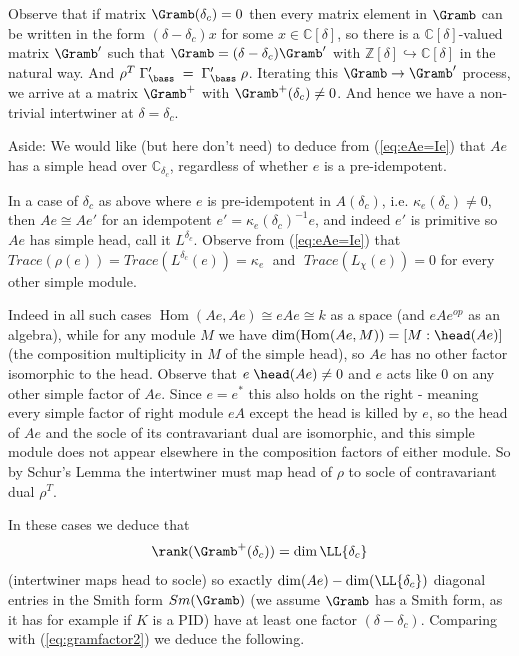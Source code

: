 \documentclass[reqno,10pt,a4paper]{amsart}
\DeclareMathOperator{\Hom}{Hom}
\newcommand{\C}{\mathbb{C}}
\newcommand{\Z}{\mathbb{Z}}
\newcommand{\red}[1]{\textcolor{red}{#1}}
\newcommand{\ppm}[1]{\red{#1}}
\newcommand{\Gram}{\Gamma}
\begin{document}
\mdef \label{pa:delta=0}
Observe that if matrix 
$\Gramb(\delta_c) = 0$    %
then every matrix element in $\Gramb$ 
can be written in the form $(\delta-\delta_c)x$ for some $x \in \C[\delta]$,
so 
there is a $\C[\delta]$-valued matrix $ \Gramb' $ such that 
$\Gramb= (\delta-\delta_c) \Gramb'$ with 
$\Z[\delta] \hookrightarrow \C[\delta]$ in the 
natural way. 
And 
$\rho^T \; \Gram_{\bass}' \; =\; \Gram_{\bass}' \; \rho$.
Iterating 
this $\Gramb\rightarrow\Gramb'$ process, 
we arrive at 
a matrix 
$\Gramb^+$ with $\Gramb^+(\delta_c  )  \neq 0 $.
{And hence we have a non-trivial intertwiner at $\delta=\delta_c$.}

Aside: 
We would like (but here don't need) to deduce from (\ref{eq:eAe=Ie}) that $Ae$ has a simple head 
over $\C_{\delta_c}$,
regardless of whether $e$ is a pre-idempotent. 

\mdef \label{pa:argument-for-4.8}
In a case of $\delta_c$ 
as above 
where $e$ is pre-idempotent in $A(\delta_c)$,
i.e. $\kappa_e(\delta_c) \neq 0$, 
then $Ae \cong Ae'$ for an idempotent 
$e' =   \kappa_e(\delta_c)^{-1}  e$, 
and indeed $e'$ is primitive so $Ae$ has simple head, call it $L^{\delta_c}$.
Observe from (\ref{eq:eAe=Ie}) that 
$Trace(\rho(e))= Trace(L^{\delta_c}(e)) = \kappa_e  \;$ 
and 
$\; Trace(L_\chi(e))=0$ for every other simple module. 

Indeed 
in all such cases
$\Hom(Ae,Ae) \cong eAe \cong k$ as a space (and $eAe^{op}$ as an algebra), 
while for any module $M$ we have 
$\dim(\Hom(Ae,M)) = [M : \head(Ae)]$ (the composition multiplicity in $M$ of the simple head),
so $Ae$ has no other factor isomorphic %
to the head.
Observe that $e\;\head(Ae)\neq 0$ and $e$ acts like 0 on any other simple factor of $Ae$.
Since $e=e^*$ this also holds on the right - meaning every simple factor 
of right module $eA$ except the head is 
killed by $e$, so the head of $Ae$ and the socle of its contravariant dual are isomorphic,
and this simple module does not appear elsewhere in the composition factors of either module.
So by Schur's Lemma the intertwiner must map head of $\rho$ to socle of contravariant dual
$\rho^T$.

In these cases we 
deduce that 
$$
\rank(\Gramb^+(\delta_c)) = \dim \LL{\delta_c} 
$$ 
(intertwiner maps head to socle)
so exactly 
$\dim(Ae) - \dim(\LL{\delta_c}) $  
diagonal entries in 
the Smith form
$Sm(\Gramb)$ 
(we assume $\Gramb$ has a Smith form, as it has for example if
$ K$ is a PID)
have at least one factor $(\delta-\delta_c)$.
%
Comparing with (\ref{eq:gramfactor2}) we deduce
the following.
\end{document}
